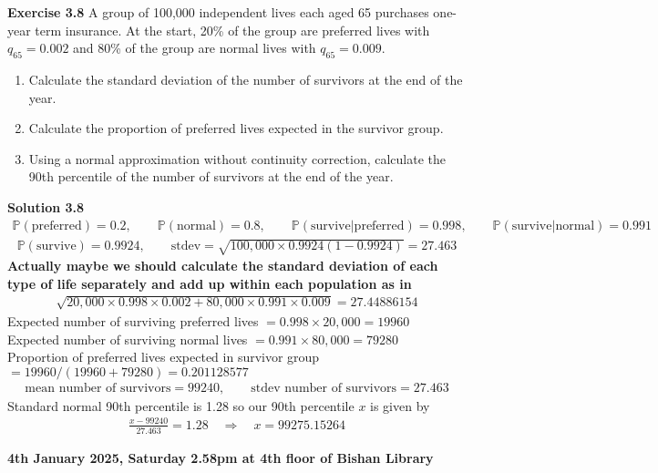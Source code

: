 \documentclass[hidelinks, 12pt]{article}
\theoremstyle{mydefstyle}
\theoremstyle{mythmstyle}
\newcounter{prop}
\begin{document}
\textbf{Exercise 3.8} A group of 100,000 independent lives each aged 65 purchases one-year term insurance. At the start, 20\% of the group are preferred lives with $q_{65} = 0.002$ and 80\% of the group are normal lives with $q_{65} = 0.009$. 
\begin{enumerate}[label = (\alph*)]
\item Calculate the standard deviation of the number of survivors at the end of the year.
\item Calculate the proportion of preferred lives expected in the survivor group.
\item Using a normal approximation without continuity correction, calculate the 90th percentile of the number of survivors at the end of the year.
\end{enumerate}

\textbf{Solution 3.8}
\begin{gather*}
\mathbb{P}(\mbox{preferred}) = 0.2, \qquad \mathbb{P}(\mbox{normal}) = 0.8, \qquad
\mathbb{P}(\mbox{survive}|\mbox{preferred}) = 0.998, \qquad
\mathbb{P}(\mbox{survive}|\mbox{normal}) = 0.991
\end{gather*}
\begin{gather*}
\mathbb{P}(\mbox{survive}) = 0.9924, \qquad \mbox{stdev} = \sqrt{100,000 \times 0.9924(1 - 0.9924)} = 27.463
\end{gather*}
\color{red}
\textbf{Actually maybe we should calculate the standard deviation of each type of life separately and add up within each population as in}
\begin{gather*}
\sqrt{20,000 \times 0.998 \times 0.002 + 80,000 \times 0.991 \times 0.009} = 27.44886154
\end{gather*}
\color{black}
Expected number of surviving preferred lives $= 0.998 \times 20,000 = 19960$ \\
Expected number of surviving normal lives $= 0.991 \times 80,000 = 79280$ \\
Proportion of preferred lives expected in survivor group $= 19960 / (19960 + 79280) = 0.201128577$
\begin{gather*}
\mbox{mean number of survivors} = 99240, \qquad \mbox{stdev number of survivors} = 27.463
\end{gather*}
Standard normal 90th percentile is 1.28 so our 90th percentile $x$ is given by
\begin{gather*}
\frac{x - 99240}{27.463} = 1.28 \quad\Rightarrow\quad x = 99275.15264
\end{gather*}

\textbf{4th January 2025, Saturday 2.58pm at 4th floor of Bishan Library}
\end{document}
